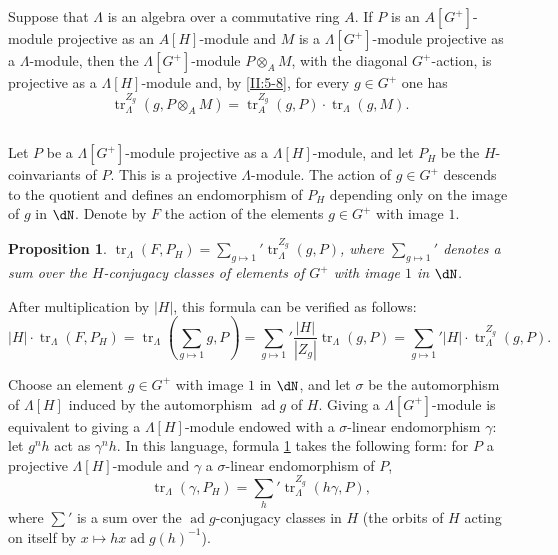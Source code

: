 \documentclass[12pt,oneside,english]{smfbook}
\DeclareMathOperator{\tr}{tr}
\newtheorem{proposition_}[subsection]{Proposition}
\begin{document}
Suppose that $\Lambda$ is an algebra over a commutative ring $A$. If $P$ is an $A[G^+]$-module projective as an $A[H]$-module and $M$ is a $\Lambda[G^+]$-module projective as a $\Lambda$-module, then the $\Lambda[G^+]$-module $P\otimes_AM$, with the diagonal $G^+$-action, is projective as a $\Lambda[H]$-module and, by \ref{II:5-8}, for every $g\in G^+$ one has
\begin{equation*}\tag{5.9.2}\label{II:eq:5-9-2}
  \tr_\Lambda^{Z_g}(g,P\otimes_A M) = \tr_A^{Z_g}(g,P) \cdot \tr_\Lambda(g,M) \text{.}
\end{equation*}

\subsection{}\label{II:5-10}

Let $P$ be a $\Lambda[G^+]$-module projective as a $\Lambda[H]$-module, and let $P_H$ be the $H$-coinvariants of $P$. This is a projective $\Lambda$-module. The action of $g\in G^+$ descends to the quotient and defines an endomorphism of $P_H$ depending only on the image of $g$ in $\dN$. Denote by $F$ the action of the elements $g\in G^+$ with image $1$.

\begin{proposition_}\label{II:5-11}
$\tr_\Lambda(F,P_H)=\sum_{g\mapsto1}'\tr_\Lambda^{Z_g}(g,P)$, where $\sum_{g\mapsto1}'$ denotes a sum over the $H$-conjugacy classes of elements of $G^+$ with image $1$ in $\dN$.
\end{proposition_}

After multiplication by $|H|$, this formula can be verified as follows:
\[
  |H|\cdot \tr_\Lambda(F,P_H)
    = \tr_\Lambda\left(\sum_{g\mapsto 1} g,P\right)
    = \sum_{g\mapsto 1}' \frac{|H|}{|Z_g|}\tr_\Lambda(g,P)
    = \sum_{g\mapsto 1}' |H|\cdot \tr_\Lambda^{Z_g}(g,P) \text{.}
\]

Choose an element $g\in G^+$ with image $1$ in $\dN$, and let $\sigma$ be the automorphism of $\Lambda[H]$ induced by the automorphism $\operatorname{ad}g$ of $H$. Giving a $\Lambda[G^+]$-module is equivalent to giving a $\Lambda[H]$-module endowed with a $\sigma$-linear endomorphism $\gamma$: let $g^nh$ act as $\gamma^nh$. In this language, formula \ref{II:5-11} takes the following form: for $P$ a projective $\Lambda[H]$-module and $\gamma$ a $\sigma$-linear endomorphism of $P$,
\[
  \tr_\Lambda(\gamma,P_H) = \sum_h' \tr_\Lambda^{Z_g}(h\gamma,P)\text{,}
\]
where $\sum'$ is a sum over the $\operatorname{ad}g$-conjugacy classes in $H$ (the orbits of $H$ acting on itself by $x\mapsto hx\operatorname{ad}g(h)^{-1}$).
\end{document}

